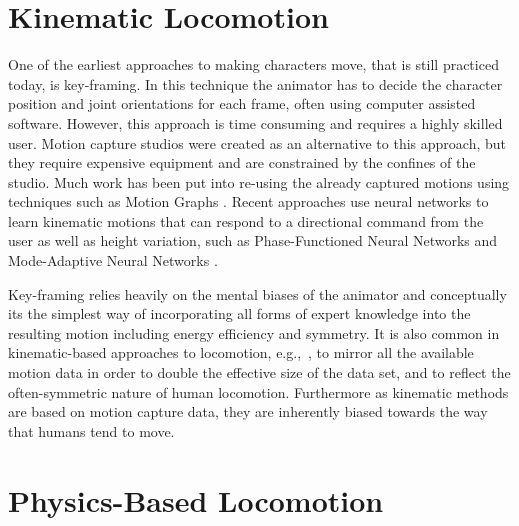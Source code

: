 \section{Kinematic Locomotion}

One of the earliest approaches to making characters move, that is still practiced today, is key-framing. In this technique the animator has to decide the character position and joint orientations for each frame, often using computer assisted software. However, this approach is time consuming and requires a highly skilled user. Motion capture studios were created as an alternative to this approach, but they require expensive equipment and are constrained by the confines of the studio. Much work has been put into re-using the already captured motions using techniques such as Motion Graphs \cite{Kovar:2002:MG:566570.566605}. Recent approaches use neural networks to learn kinematic motions that can respond to a directional command from the user as well as height variation, such as Phase-Functioned Neural Networks  \cite{PFNN} and Mode-Adaptive Neural Networks \cite{MANN}.

Key-framing relies heavily on the mental biases of the animator and conceptually its the simplest way of incorporating all forms of expert knowledge into the resulting motion including energy efficiency and symmetry.
It is also common in kinematic-based approaches to locomotion, e.g.,~\cite{bruderlin,HoldenPFNN}, to mirror all the available motion data in order to double the effective size of the data set, and to reflect the often-symmetric nature of human locomotion.
Furthermore as kinematic methods are based on motion capture data, they are inherently biased towards the way that humans tend to move.




\section{Physics-Based Locomotion}


